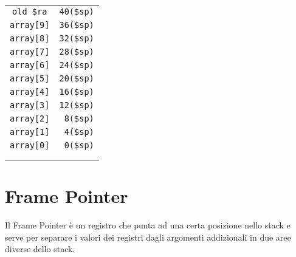 \documentclass[../main.tex]{subfiles}
\begin{document}
\begin{table}[h!]
\begin{minipage}{.2\linewidth}
\begin{tabular}{ | c | r }
            \cline{1-1}
            \texttt{old \$ra} & \texttt{40(\$sp)} \\
            \cline{1-1}
            \texttt{array[9]} & \texttt{36(\$sp)} \\
            \cline{1-1}
            \texttt{array[8]} & \texttt{32(\$sp)} \\
            \cline{1-1}
            \texttt{array[7]} & \texttt{28(\$sp)} \\
            \cline{1-1}
            \texttt{array[6]} & \texttt{24(\$sp)} \\
            \cline{1-1}
            \texttt{array[5]} & \texttt{20(\$sp)} \\
            \cline{1-1}
            \texttt{array[4]} & \texttt{16(\$sp)} \\
            \cline{1-1}
            \texttt{array[3]} & \texttt{12(\$sp)} \\
            \cline{1-1}
            \texttt{array[2]} & \texttt{8(\$sp)} \\
            \cline{1-1}
            \texttt{array[1]} & \texttt{4(\$sp)} \\
            \cline{1-1}
            \texttt{array[0]} & \texttt{0(\$sp)} \\
            \cline{1-1}
            \\ \\
            \cline{1-1}
        \end{tabular}
    \end{minipage}
\end{table}

\section{Frame Pointer}
Il Frame Pointer è un registro che punta ad una certa posizione
nello stack e serve per separare i valori dei registri
dagli argomenti addizionali in due aree diverse dello stack.
\end{document}
